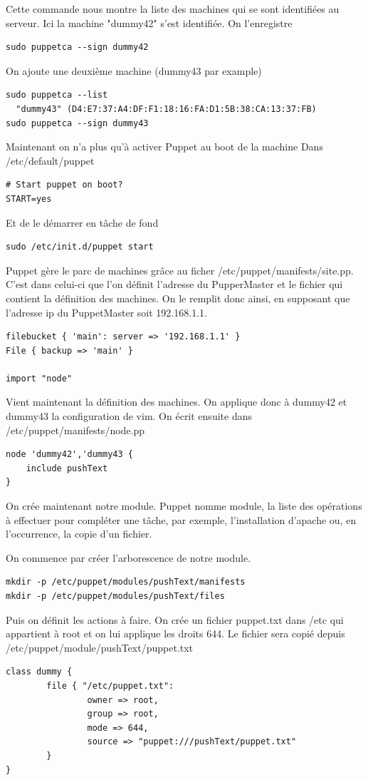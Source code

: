 \documentclass[a4paper,oneside]{report}
\begin{document}
Cette commande nous montre la liste des machines qui se sont identifiées au serveur.
Ici la machine "dummy42" s'est identifiée.
On l'enregistre
\begin{verbatim}
sudo puppetca --sign dummy42
\end{verbatim}

On ajoute une deuxième machine (dummy43 par example)
\begin{verbatim}
sudo puppetca --list
  "dummy43" (D4:E7:37:A4:DF:F1:18:16:FA:D1:5B:38:CA:13:37:FB)
sudo puppetca --sign dummy43
\end{verbatim}

Maintenant on n'a plus qu'à activer Puppet au boot de la machine
Dans /etc/default/puppet
\begin{verbatim}
# Start puppet on boot?
START=yes
\end{verbatim}
Et de le démarrer en tâche de fond
\begin{verbatim}
sudo /etc/init.d/puppet start
\end{verbatim}

Puppet gère le parc de machines grâce au ficher /etc/puppet/manifests/site.pp. C'est dans celui-ci que l'on définit l'adresse du PupperMaster et le fichier qui contient la définition des machines. On le remplit donc ainsi, en supposant que l'adresse ip du PuppetMaster soit 192.168.1.1.
\begin{verbatim}
filebucket { 'main': server => '192.168.1.1' }
File { backup => 'main' }
 
import "node"
\end{verbatim}

Vient maintenant la définition des machines. On applique donc à dummy42 et dummy43 la configuration de vim. On écrit ensuite dans /etc/puppet/manifests/node.pp
\begin{verbatim}
node 'dummy42','dummy43 {
    include pushText
}
\end{verbatim}

On crée maintenant notre module. Puppet nomme module, la liste des opérations à effectuer pour compléter une tâche, par exemple, l'installation d'apache ou, en l'occurrence, la copie d'un fichier.

On commence par créer l'arborescence de notre module.
\begin{verbatim}
mkdir -p /etc/puppet/modules/pushText/manifests
mkdir -p /etc/puppet/modules/pushText/files
\end{verbatim}

Puis on définit les actions à faire. On crée un fichier puppet.txt dans /etc qui appartient à root et on lui applique les droits 644. Le fichier sera copié depuis /etc/puppet/module/pushText/puppet.txt 
\begin{verbatim}
class dummy {
        file { "/etc/puppet.txt":
                owner => root,
                group => root,
                mode => 644,
                source => "puppet:///pushText/puppet.txt"
        }
}
\end{verbatim}
\end{document}
